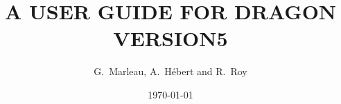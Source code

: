 \documentclass{report}
\begin{document}
\title{A USER GUIDE FOR DRAGON VERSION5}

\author{G.~Marleau, A.~H\'ebert and R.~Roy}

\date{\today}


                




\clearpage
{}
\tableofcontents
\clearpage
{}
\listoffigures
\clearpage
{}
\listoftables

\Debutdutexte










\clearpage
{}

\clearpage
\printindex
\end{document}
